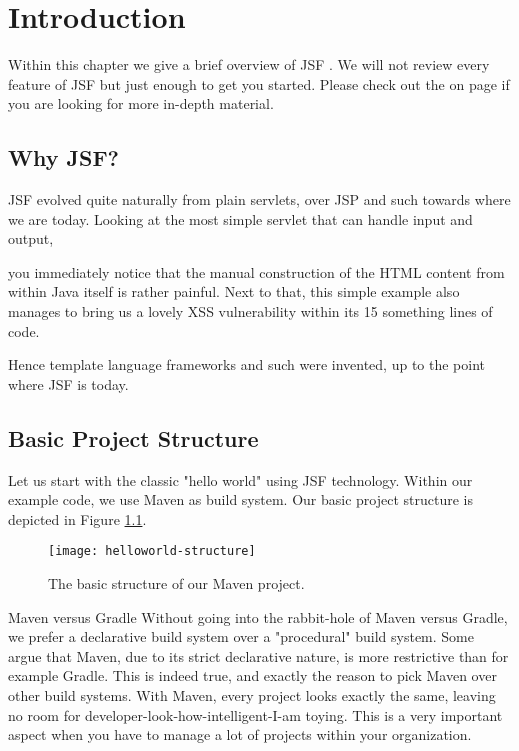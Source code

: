 %

\chapter{Introduction}

Within this chapter we give a brief overview of JSF \cite{JSF23}.
We will not review every feature of JSF but just enough to get you started.
Please check out the  on page \pageref{chap:references} if you are looking for more in-depth material.

\section{Why JSF?}
JSF evolved quite naturally from plain servlets, over JSP and such towards where we are today.
Looking at the most simple servlet that can handle input and output,

you immediately notice that the manual construction of the HTML content from within Java itself is rather painful.
Next to that, this simple example also manages to bring us a lovely XSS vulnerability within its 15 something lines of code.

Hence template language frameworks and such were invented, up to the point where JSF is today.


\section{Basic Project Structure}
Let us start with the classic "hello world" using JSF technology.
Within our example code, we use Maven as build system.
Our basic project structure is depicted in Figure \ref{fig:helloworld-structure}.
\begin{figure}[htbp]
	\begin{center}
		\texttt{[image: helloworld-structure]}
		\caption{The basic structure of our Maven project.}
		\label{fig:helloworld-structure}
	\end{center}
\end{figure}

\begin{ClownComputing}{Maven versus Gradle}
	Without going into the rabbit-hole of Maven versus Gradle, we prefer a declarative build system over a "procedural" build system.
	Some argue that Maven, due to its strict declarative nature, is more restrictive than for example Gradle.
	This is indeed true, and exactly the reason to pick Maven over other build systems.
	With Maven, every project looks exactly the same, leaving no room for developer-look-how-intelligent-I-am toying.
	This is a very important aspect when you have to manage a lot of projects within your organization.
\end{ClownComputing}

